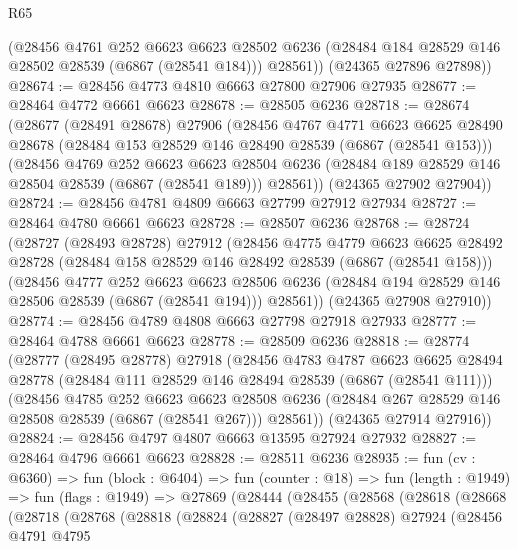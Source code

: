 \begin{lexlean}{R65}
\begin{coremodule}
{        (@28456
          @4761
          @252
          @6623
          @6623
          @28502
          @6236
          (@28484 @184 @28529 @146 @28502 @28539 (@6867 (@28541 @184)))
          @28561))
      (@24365 @27896 @27898))
@28674 := @28456 @4773 @4810 @6663 @27800 @27906 @27935
@28677 := @28464 @4772 @6661 @6623
@28678 := @28505 @6236
@28718 := @28674
    (@28677
      (@28491 @28678)
      @27906
      (@28456
        @4767
        @4771
        @6623
        @6625
        @28490
        @28678
        (@28484 @153 @28529 @146 @28490 @28539 (@6867 (@28541 @153)))
        (@28456
          @4769
          @252
          @6623
          @6623
          @28504
          @6236
          (@28484 @189 @28529 @146 @28504 @28539 (@6867 (@28541 @189)))
          @28561))
      (@24365 @27902 @27904))
@28724 := @28456 @4781 @4809 @6663 @27799 @27912 @27934
@28727 := @28464 @4780 @6661 @6623
@28728 := @28507 @6236
@28768 := @28724
    (@28727
      (@28493 @28728)
      @27912
      (@28456
        @4775
        @4779
        @6623
        @6625
        @28492
        @28728
        (@28484 @158 @28529 @146 @28492 @28539 (@6867 (@28541 @158)))
        (@28456
          @4777
          @252
          @6623
          @6623
          @28506
          @6236
          (@28484 @194 @28529 @146 @28506 @28539 (@6867 (@28541 @194)))
          @28561))
      (@24365 @27908 @27910))
@28774 := @28456 @4789 @4808 @6663 @27798 @27918 @27933
@28777 := @28464 @4788 @6661 @6623
@28778 := @28509 @6236
@28818 := @28774
    (@28777
      (@28495 @28778)
      @27918
      (@28456
        @4783
        @4787
        @6623
        @6625
        @28494
        @28778
        (@28484 @111 @28529 @146 @28494 @28539 (@6867 (@28541 @111)))
        (@28456
          @4785
          @252
          @6623
          @6623
          @28508
          @6236
          (@28484 @267 @28529 @146 @28508 @28539 (@6867 (@28541 @267)))
          @28561))
      (@24365 @27914 @27916))
@28824 := @28456 @4797 @4807 @6663 @13595 @27924 @27932
@28827 := @28464 @4796 @6661 @6623
@28828 := @28511 @6236
@28935 := fun (cv : @6360) =>
  fun (block : @6404) =>
  fun (counter : @18) =>
  fun (length : @1949) =>
  fun (flags : @1949) =>
  @27869
    (@28444
      (@28455
        (@28568
          (@28618
            (@28668
              (@28718
                (@28768
                  (@28818
                    (@28824
                      (@28827
                        (@28497 @28828)
                        @27924
                        (@28456
                          @4791
                          @4795
}
\end{coremodule}
\end{lexlean}
